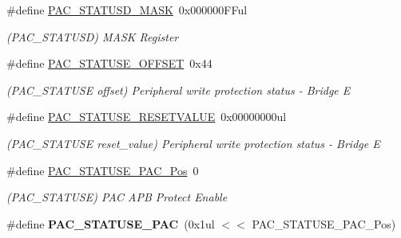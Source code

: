 \begin{DoxyCompactItemize}
\item 
\hypertarget{group___s_a_m_l21___p_a_c_ga00d22737e63523d60365c645b3efff3a}{}\#define \hyperlink{group___s_a_m_l21___p_a_c_ga00d22737e63523d60365c645b3efff3a}{P\+A\+C\+\_\+\+S\+T\+A\+T\+U\+S\+D\+\_\+\+M\+A\+S\+K}~0x000000\+F\+Ful\label{group___s_a_m_l21___p_a_c_ga00d22737e63523d60365c645b3efff3a}

\begin{DoxyCompactList}\small\item\em (P\+A\+C\+\_\+\+S\+T\+A\+T\+U\+S\+D) M\+A\+S\+K Register \end{DoxyCompactList}\item 
\hypertarget{group___s_a_m_l21___p_a_c_gaa0b2baa64343f94b27e25ff29c662c4f}{}\#define \hyperlink{group___s_a_m_l21___p_a_c_gaa0b2baa64343f94b27e25ff29c662c4f}{P\+A\+C\+\_\+\+S\+T\+A\+T\+U\+S\+E\+\_\+\+O\+F\+F\+S\+E\+T}~0x44\label{group___s_a_m_l21___p_a_c_gaa0b2baa64343f94b27e25ff29c662c4f}

\begin{DoxyCompactList}\small\item\em (P\+A\+C\+\_\+\+S\+T\+A\+T\+U\+S\+E offset) Peripheral write protection status -\/ Bridge E \end{DoxyCompactList}\item 
\hypertarget{group___s_a_m_l21___p_a_c_gadb6d360e2d27003ff56a01f7301432b9}{}\#define \hyperlink{group___s_a_m_l21___p_a_c_gadb6d360e2d27003ff56a01f7301432b9}{P\+A\+C\+\_\+\+S\+T\+A\+T\+U\+S\+E\+\_\+\+R\+E\+S\+E\+T\+V\+A\+L\+U\+E}~0x00000000ul\label{group___s_a_m_l21___p_a_c_gadb6d360e2d27003ff56a01f7301432b9}

\begin{DoxyCompactList}\small\item\em (P\+A\+C\+\_\+\+S\+T\+A\+T\+U\+S\+E reset\+\_\+value) Peripheral write protection status -\/ Bridge E \end{DoxyCompactList}\item 
\hypertarget{group___s_a_m_l21___p_a_c_ga1ec3efedbc456a7599aa0602347b182e}{}\#define \hyperlink{group___s_a_m_l21___p_a_c_ga1ec3efedbc456a7599aa0602347b182e}{P\+A\+C\+\_\+\+S\+T\+A\+T\+U\+S\+E\+\_\+\+P\+A\+C\+\_\+\+Pos}~0\label{group___s_a_m_l21___p_a_c_ga1ec3efedbc456a7599aa0602347b182e}

\begin{DoxyCompactList}\small\item\em (P\+A\+C\+\_\+\+S\+T\+A\+T\+U\+S\+E) P\+A\+C A\+P\+B Protect Enable \end{DoxyCompactList}\item 
\hypertarget{group___s_a_m_l21___p_a_c_ga57c08402ecd70ca7b314710c09428cdf}{}\#define {\bfseries P\+A\+C\+\_\+\+S\+T\+A\+T\+U\+S\+E\+\_\+\+P\+A\+C}~(0x1ul $<$$<$ P\+A\+C\+\_\+\+S\+T\+A\+T\+U\+S\+E\+\_\+\+P\+A\+C\+\_\+\+Pos)\label{group___s_a_m_l21___p_a_c_ga57c08402ecd70ca7b314710c09428cdf}


\end{DoxyCompactItemize}
